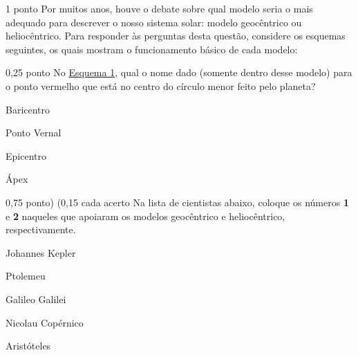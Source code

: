 \documentclass{../lista}
\begin{document}
	\begin{questao}{1 ponto}
		Por muitos anos, houve o debate sobre qual modelo seria o mais adequado para descrever o nosso sistema solar: modelo geocêntrico ou heliocêntrico. Para responder às perguntas desta questão, considere os esquemas seguintes, os quais mostram o funcionamento básico de cada modelo:
		
		

		\begin{pergunta}{0,25 ponto}
			No \hyperref[img:geocentrico]{Esquema 1}, qual o nome dado (somente dentro desse modelo) para o ponto vermelho que está no centro do círculo menor feito pelo planeta?
			\begin{multicols}{2} \begin{alternativas}
				\item Baricentro
				\item Ponto Vernal
				\item Epicentro
				\item Ápex
			\end{alternativas} \end{multicols}
		\end{pergunta}

		\begin{pergunta}{0,75 ponto) (0,15 cada acerto}
			Na lista de cientistas abaixo, coloque os números \textbf{1} e \textbf{2} naqueles que apoiaram os modelos geocêntrico e heliocêntrico, respectivamente.
			\begin{alternativas}
				\item Johannes Kepler
				\item Ptolemeu
				\item Galileo Galilei
				\item Nicolau Copérnico
				\item Aristóteles
			\end{alternativas}
		\end{pergunta}
	\end{questao}
	
	\encerramento
\end{document}
